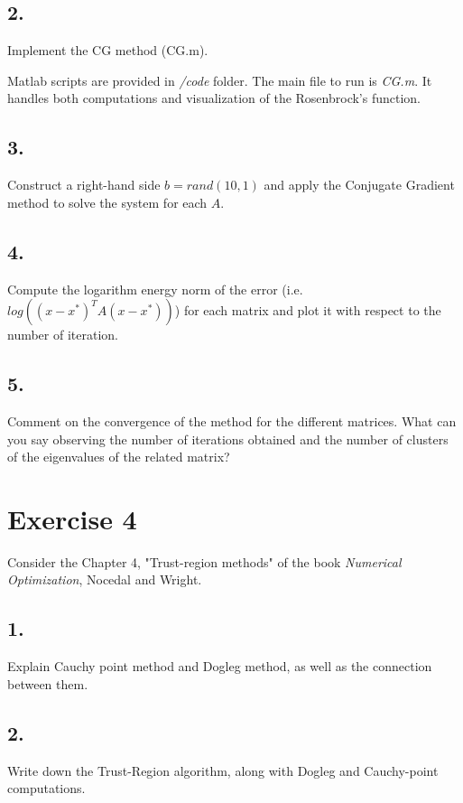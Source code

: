\documentclass[unicode,11pt,a4paper,oneside,numbers=endperiod,openany]{scrartcl}
\begin{document}
\subsection*{2.}
Implement the CG method (CG.m).

Matlab scripts are provided in \textit{/code} folder.
The main file to run is \textit{CG.m}.
It handles both computations and visualization of the Rosenbrock's function.

\subsection*{3.}
Construct a right-hand side $b = rand(10,1)$ and apply the Conjugate Gradient method to solve the
system for each $A$.

\subsection*{4.}
Compute the logarithm energy norm of the error (i.e. $log((x - x^*)^T A(x - x^*))$)
for each matrix and plot it with respect to the number of iteration.

\subsection*{5.}
Comment on the convergence of the method for the different matrices.
What can you say observing the number of iterations obtained
and the number of clusters of the eigenvalues of the related matrix?


\section*{Exercise 4}
Consider the Chapter 4, "Trust-region methods" of the book \textit{Numerical Optimization},
Nocedal and Wright.

\subsection*{1.}
Explain  Cauchy point method and Dogleg method, as well as the connection between them.

\subsection*{2.}
Write down the Trust-Region algorithm, along with Dogleg and Cauchy-point computations.
\end{document}
